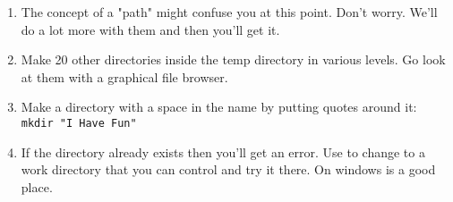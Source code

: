 \begin{enumerate}
\item The concept of a "path" might confuse you at this point.  Don't worry. We'll 
    do a lot more with them and then you'll get it.
\item Make 20 other directories inside the temp directory in various levels.  Go look at them
    with a graphical file browser.
\item Make a directory with a space in the name by putting quotes around it: \verb|mkdir "I Have Fun"|
\item If the  directory already exists then you'll get an error.  Use  to change to a work directory that you can control and try it there.  On windows  is a good place.
\end{enumerate}

